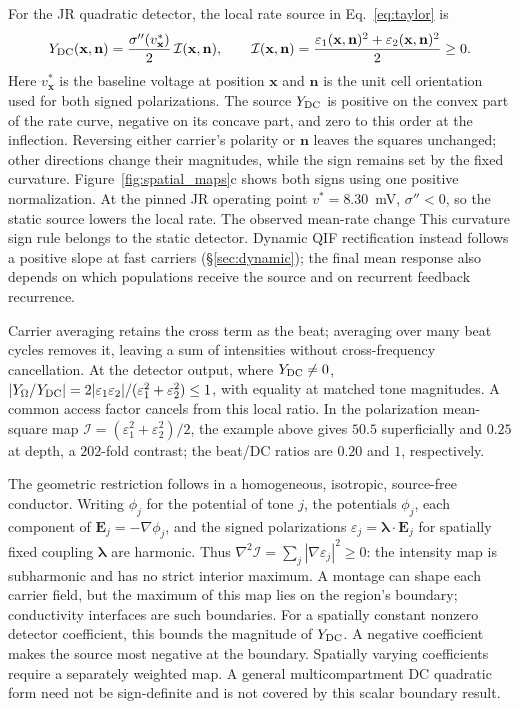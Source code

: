 \documentclass[11pt,a4paper]{article}
\newcommand{\Sig}{\sigma}
\providecommand{\DIFaddtex}[1]{{\protect\color{blue} \sf #1}} %
\providecommand{\DIFdeltex}[1]{{\protect\color{red} \scriptsize #1}} %
\providecommand{\DIFaddbegin}{} %
\providecommand{\DIFaddend}{} %
\providecommand{\DIFdelbegin}{} %
\providecommand{\DIFdelend}{} %
\providecommand{\DIFadd}[1]{\texorpdfstring{\DIFaddtex{#1}}{#1}} %
\providecommand{\DIFdel}[1]{\texorpdfstring{\DIFdeltex{#1}}{}} %
\begin{document}
For the JR quadratic detector, the local rate source in Eq.~\eqref{eq:taylor} is
\[
Y_{\rm DC}(\mathbf x,\mathbf n)
=\frac{\Sig''(v^*_{\mathbf x})}{2}\,\mathcal I(\mathbf x,\mathbf n),
\qquad
\mathcal I(\mathbf x,\mathbf n)
=\frac{\varepsilon_1(\mathbf x,\mathbf n)^2+
\varepsilon_2(\mathbf x,\mathbf n)^2}{2}\ge0.
\]
Here $v^*_{\mathbf x}$ is the baseline voltage at position $\mathbf x$ and
$\mathbf n$ is the unit cell orientation used for both signed polarizations.
The source $Y_{\rm DC}$ is positive on the convex part of the rate curve,
negative on its concave part, and zero to this order at the inflection.
Reversing either carrier's polarity or $\mathbf n$ leaves the squares unchanged;
other directions change their magnitudes, while the sign remains set by the fixed curvature.
Figure~\ref{fig:spatial_maps}c shows both signs using one positive normalization.
At the pinned JR operating point $v^*=8.30$~mV, $\Sig''<0$, so the static
source lowers the local rate.
\DIFdelbegin \DIFdel{The observed mean-rate change }\DIFdelend \DIFaddbegin \DIFadd{This curvature sign rule belongs to the static detector. Dynamic QIF
rectification instead follows a positive slope at fast carriers
(\S\ref{sec:dynamic}); the final mean response }\DIFaddend also depends on \DIFdelbegin \DIFdel{which populations receive the
source and on recurrent feedback}\DIFdelend \DIFaddbegin \DIFadd{recurrence}\DIFaddend .

Carrier averaging retains the cross term as the beat;
averaging over many beat cycles removes it, leaving a sum of intensities without
cross-frequency cancellation. At the detector output, where $Y_{\rm DC}\ne0$,
$|Y_\Omega/Y_{\rm DC}|=2|\varepsilon_1\varepsilon_2|/
(\varepsilon_1^2+\varepsilon_2^2)\le1$, with equality at matched tone magnitudes.
A common access factor cancels from this local ratio. In the polarization
mean-square map $\mathcal I=(\varepsilon_1^2+\varepsilon_2^2)/2$, the example
above gives $50.5$ superficially and $0.25$ at depth, a $202$-fold contrast;
the beat/DC ratios are $0.20$ and $1$, respectively.

The geometric restriction follows in a homogeneous, isotropic, source-free conductor. Writing $\phi_j$ for the potential of tone $j$, the
potentials $\phi_j$, each component of $\mathbf E_j=-\nabla\phi_j$, and the
signed polarizations $\varepsilon_j=\boldsymbol\lambda\cdot\mathbf E_j$ for
spatially fixed coupling $\boldsymbol\lambda$ are harmonic. Thus
$\nabla^2\mathcal I=\sum_j|\nabla\varepsilon_j|^2\ge0$: the intensity map is
subharmonic and has no strict interior maximum. A montage can shape each
carrier field, but the maximum of this map lies on the region's boundary;
conductivity interfaces are such boundaries.
For a spatially constant nonzero detector coefficient, this bounds the magnitude
of $Y_{\rm DC}$. A negative coefficient makes the source most negative at the
boundary. Spatially varying coefficients require a separately weighted map. \DIFaddbegin \DIFadd{A general
multicompartment DC quadratic form need not be sign-definite and is not
covered by this scalar boundary result.
}\DIFaddend
\end{document}
